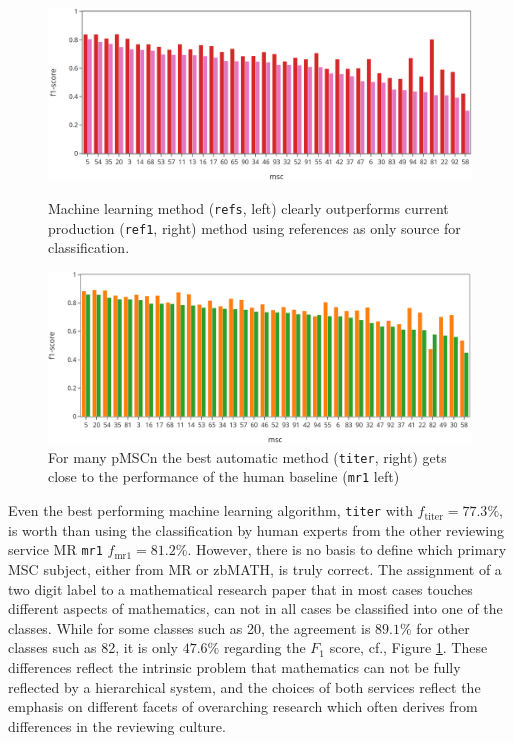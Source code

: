 \begin{figure}[t]
  \centering
  \includegraphics[width=1\textwidth]{ref1-refs.png}
  \caption{Machine learning method (\texttt{refs}, left)  clearly outperforms current production (\texttt{ref1}, right) method using references as only source for classification.}\label{fgRefs}
  \includegraphics[width=1\textwidth]{mr1-titer.png}
  \caption{For many pMSCn the best automatic method (\texttt{titer}, right) gets close to the performance of the human baseline (\texttt{mr1} left)}\label{fgHum}
\end{figure}
Even the best performing machine learning algorithm, \texttt{titer} with $f_\mathrm{titer}=77.3\%$, is worth than using the classification by human experts from the other reviewing service MR \texttt{mr1} $f_\mathrm{mr1}=81.2\%.$ 
However, there is no basis to define which primary MSC subject, either from MR or zbMATH, is truly correct.
The assignment of a two digit label to a mathematical research paper that in most cases touches different aspects of mathematics, can not in all cases be classified into one of the classes.
While for some classes such as 20, the agreement is $89.1\%$ for other classes such as 82, it is only $47.6\%$ regarding the $F_1$ score, cf., Figure \ref{fgHum}.
These differences reflect the intrinsic problem that mathematics can not be fully reflected by a hierarchical system, and the choices of both services reflect the emphasis on different facets of overarching research which often derives from differences in the reviewing culture.

